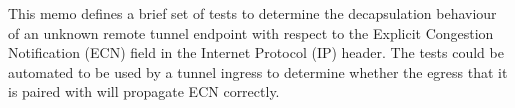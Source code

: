 
This memo defines a brief set of tests to determine the decapsulation behaviour
of an unknown remote tunnel endpoint with respect to the Explicit Congestion
Notification (ECN) field in the Internet Protocol (IP) header. The tests could
be automated to be used by a tunnel ingress to determine whether the egress that
it is paired with will propagate ECN correctly.



